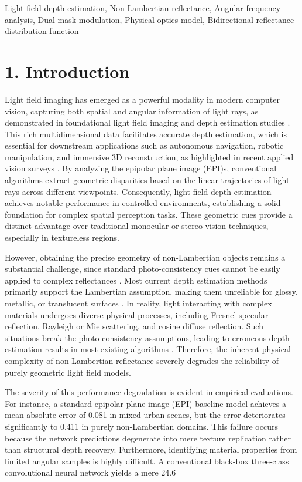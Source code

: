 \documentclass[lettersize,journal]{IEEEtran}
\begin{document}
\begin{IEEEkeywords}
Light field depth estimation, Non-Lambertian reflectance, Angular frequency analysis, Dual-mask modulation, Physical optics model, Bidirectional reflectance distribution function
\end{IEEEkeywords}

\section{1. Introduction}

Light field imaging has emerged as a powerful modality in modern computer vision, capturing both spatial and angular information of light rays, as demonstrated in foundational light field imaging and depth estimation studies . This rich multidimensional data facilitates accurate depth estimation, which is essential for downstream applications such as autonomous navigation, robotic manipulation, and immersive 3D reconstruction, as highlighted in recent applied vision surveys . By analyzing the epipolar plane image (EPI)s, conventional algorithms extract geometric disparities based on the linear trajectories of light rays across different viewpoints. Consequently, light field depth estimation achieves notable performance in controlled environments, establishing a solid foundation for complex spatial perception tasks. These geometric cues provide a distinct advantage over traditional monocular or stereo vision techniques, especially in textureless regions.

However, obtaining the precise geometry of non-Lambertian objects remains a substantial challenge, since standard photo-consistency cues cannot be easily applied to complex reflectances . Most current depth estimation methods primarily support the Lambertian assumption, making them unreliable for glossy, metallic, or translucent surfaces . In reality, light interacting with complex materials undergoes diverse physical processes, including Fresnel specular reflection, Rayleigh or Mie scattering, and cosine diffuse reflection. Such situations break the photo-consistency assumptions, leading to erroneous depth estimation results in most existing algorithms . Therefore, the inherent physical complexity of non-Lambertian reflectance severely degrades the reliability of purely geometric light field models.

The severity of this performance degradation is evident in empirical evaluations. For instance, a standard epipolar plane image (EPI) baseline model achieves a mean absolute error of 0.081 in mixed urban scenes, but the error deteriorates significantly to 0.411 in purely non-Lambertian domains. This failure occurs because the network predictions degenerate into mere texture replication rather than structural depth recovery. Furthermore, identifying material properties from limited angular samples is highly difficult. A conventional black-box three-class convolutional neural network yields a mere 24.6\\%
\end{document}
